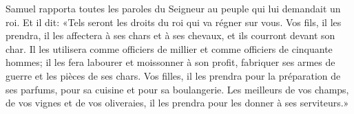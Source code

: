 Samuel rapporta toutes les paroles du Seigneur au peuple qui lui demandait un roi.
Et il dit: «Tels seront les droits du roi qui va régner sur vous.
	Vos fils, il les prendra, il les affectera à ses chars et à ses chevaux,
	et ils courront devant son char.
Il les utilisera comme officiers de millier et comme officiers de cinquante hommes;
	il les fera labourer et moissonner à son profit,
	fabriquer ses armes de guerre et les pièces de ses chars.
Vos filles, il les prendra pour la préparation de ses parfums,
	pour sa cuisine et pour sa boulangerie.
Les meilleurs de vos champs, de vos vignes et de vos oliveraies,
	il les prendra pour les donner à ses serviteurs.»

